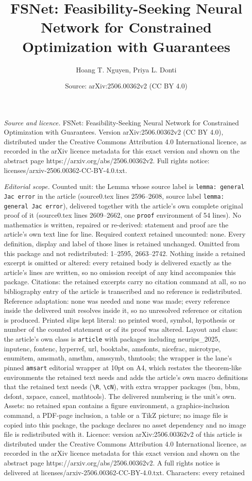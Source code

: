 \documentclass[10pt,a4paper]{amsart}
\title[FSNet: Feasibility-Seeking Neural Network for Constrained Op]{FSNet: Feasibility-Seeking Neural Network for Constrained Optimization with Guarantees}
\author{Hoang T. Nguyen, Priya L. Donti}
\date{Source: arXiv:2506.00362v2 (CC BY 4.0)}
\begin{document}
\maketitle

\noindent\emph{Source and licence.} FSNet: Feasibility-Seeking Neural Network for Constrained Optimization with Guarantees. Version arXiv:2506.00362v2 (CC BY 4.0), distributed under the Creative Commons Attribution 4.0 International licence, as recorded in the arXiv licence metadata for this exact version and shown on the abstract page https://arxiv.org/abs/2506.00362v2. Full rights notice: licenses/arxiv-2506.00362-CC-BY-4.0.txt.\par\smallskip

\noindent\textit{Editorial scope.} Counted unit: the Lemma whose source label is \texttt{lemma: general Jac error} in the article (source0.tex lines 2596--2608, source label \texttt{lemma: general Jac error}), delivered together with the article's own complete original proof of it (source0.tex lines 2609--2662, one \texttt{proof} environment of 54 lines). No mathematics is written, repaired or re-derived: statement and proof are the article's own text line for line. Required context retained uncounted: none. Every definition, display and label of those lines is retained unchanged. Omitted from this package and not redistributed: 1--2595, 2663--2742. Nothing inside a retained excerpt is omitted or altered: every retained body is delivered exactly as the article's lines are written, so no omission receipt of any kind accompanies this package. Citations: the retained excerpts carry no citation command at all, so no bibliography entry of the article is transcribed and no reference is redistributed. Reference adaptation: none was needed and none was made; every reference inside the delivered unit resolves inside it, so no unresolved reference or citation is produced. Printed slips kept literal: no printed word, symbol, hypothesis or number of the counted statement or of its proof was altered. Layout and class: the article's own class is \texttt{article} with packages including neurips\_2025, inputenc, fontenc, hyperref, url, booktabs, amsfonts, nicefrac, microtype, enumitem, amsmath, amsthm, amssymb, thmtools; the wrapper is the lane's pinned \texttt{amsart} editorial wrapper at 10pt on A4, which restates the theorem-like environments the retained text needs and adds the article's own macro definitions that the retained text needs (\texttt{\textbackslash R}, \texttt{\textbackslash cN}), with extra wrapper packages (bm, bbm, dsfont, xspace, cancel, mathtools). The delivered numbering is the unit's own. Assets: no retained span contains a figure environment, a graphics-inclusion command, a PDF-page inclusion, a table or a TikZ picture; no image file is copied into this package, the package declares no asset dependency and no image file is redistributed with it. Licence: version arXiv:2506.00362v2 of this article is distributed under the Creative Commons Attribution 4.0 International licence, as recorded in the arXiv licence metadata for this exact version and shown on the abstract page https://arxiv.org/abs/2506.00362v2. A full rights notice is delivered at licenses/arxiv-2506.00362-CC-BY-4.0.txt. Characters: every retained 
\end{document}
